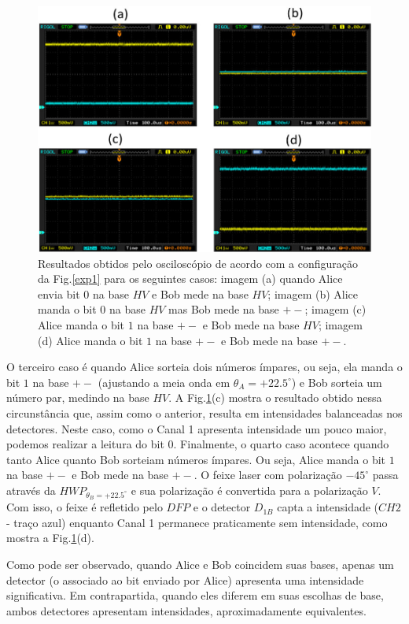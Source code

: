 \documentclass[pra, twocolumn]{revtex4}
\begin{document}
\begin{figure} [H]
     \centering
     \includegraphics[scale=0.6, trim=1cm 0cm 1cm 0cm, clip=true,width =8.5 cm, height=6 cm]{fig4.jpg}
     \caption[Resultados obtidos pelo oscilosc\'opio de acordo com a configura\c c\~ao da Fig.\ref{exp1}]{Resultados obtidos pelo oscilosc\'opio de acordo com a configura\c c\~ao da Fig.\ref{exp1} para os seguintes casos: imagem (a) quando Alice envia bit $0$ na base $HV$ e Bob mede na base $HV$; imagem (b) Alice manda o bit $0$ na base $HV$ mas Bob mede na base $+-$; imagem (c) Alice manda o bit $1$ na base $+-$ e Bob mede na base $HV$; imagem (d) Alice manda o bit $1$ na base $+-$ e Bob mede na base $+-$.}
     \label{fig4}
\end{figure}

O terceiro caso \'e quando Alice sorteia dois n\'umeros \'impares, ou seja, ela manda o bit $1$ na base $+-$ (ajustando a meia onda em $\theta_A=+22.5^\circ$) e Bob sorteia um n\'umero par, medindo na base $HV$. A Fig.\ref{fig4}(c) mostra o resultado obtido nessa circunst\^ancia que, assim como o anterior, resulta em intensidades balanceadas nos detectores. Neste caso, como o Canal 1 apresenta intensidade um pouco maior, podemos realizar a leitura do bit $0$. Finalmente, o quarto caso acontece quando tanto Alice quanto Bob sorteiam n\'umeros \'impares. Ou seja, Alice manda o bit $1$ na base $+-$ e Bob mede na base $+-$. O feixe laser com polariza\c c\~ao $-45^\circ$ passa atrav\'es da  $HWP_{\theta_B=+22.5^\circ}$ e sua polariza\c c\~ao \'e convertida para a polariza\c c\~ao $V$. Com isso, o feixe \'e refletido pelo $DFP$ e o detector $D_{1B}$ capta a intensidade ($CH2$ - tra\c co azul) enquanto Canal 1 permanece praticamente sem intensidade, como mostra a Fig.\ref{fig4}(d).

Como pode ser observado, quando Alice e Bob coincidem suas bases, apenas um detector (o associado ao bit enviado por Alice) apresenta uma intensidade significativa. Em contrapartida, quando eles diferem em suas escolhas de base, ambos detectores apresentam intensidades, aproximadamente equivalentes.
\end{document}
